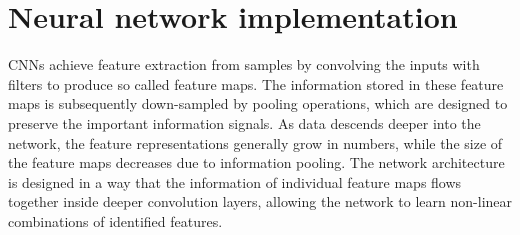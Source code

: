 \documentclass[fleqn,usenatbib]{mnras}
\begin{document}
\section{Neural network implementation}
\label{sec:NN_implementation}
CNNs achieve feature extraction from samples by convolving the inputs with filters to produce so called feature maps. The information stored in these feature maps is subsequently down-sampled by pooling operations, which are designed to preserve the important information signals. As data descends deeper into the network, the feature representations generally grow in numbers, while the size of the feature maps decreases due to information pooling. The network architecture is designed in a way that the information of individual feature maps flows together inside deeper convolution layers, allowing the network to learn non-linear combinations of identified features.
\end{document}
